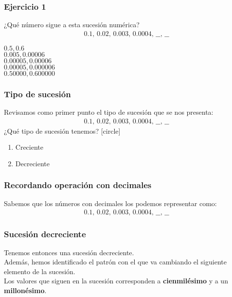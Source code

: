 \begin{frame}
\frametitle{Ejercicio 1}
¿Qué número sigue a esta sucesión numérica?
\begin{align*}
0.1, \, 0.02, \, 0.003, \, 0.0004, \, \_\_ , \, \_\_
\end{align*}
\begin{choices}
\choice $0.5, 0.6$ \\
\choice $0.005, 0.00006$ \\
\choice $0.00005, 0.00006$ \\
\choice $0.00005, 0.000006$ \\
\choice $0.50000, 0.600000$ \\
\end{choices}
\end{frame}
\begin{frame}
\frametitle{Tipo de sucesión}
Revisamos como primer punto el tipo de sucesión que se nos presenta:
\begin{align*}
0.1, \, 0.02, \, 0.003, \, 0.0004, \, \_\_ , \, \_\_
\end{align*}
\pause
¿Qué tipo de sucesión tenemos?
\pause
{}
[circle]
\begin{enumerate}[<+->]
\item Creciente
\item Decreciente
\end{enumerate}
\end{frame}
\begin{frame}
\frametitle{Recordando operación con decimales}
Sabemos que los números con decimales los podemos representar como:
\begin{align*}
0.1, \, 0.02, \, 0.003, \, 0.0004, \, \_\_ , \, \_\_
\end{align*}
\pause
{}
\end{frame}
\begin{frame}
\frametitle{Sucesión decreciente}
Tenemos entonces una sucesión decreciente.
\\
\bigskip
\pause
Además, hemos identificado el patrón con el que va cambiando el siguiente elemento de la sucesión.
\\
\bigskip
\pause
Los valores que siguen en la sucesión corresponden a \textbf{cienmilésimo} y a un \textbf{millonésimo}.
\end{frame}
